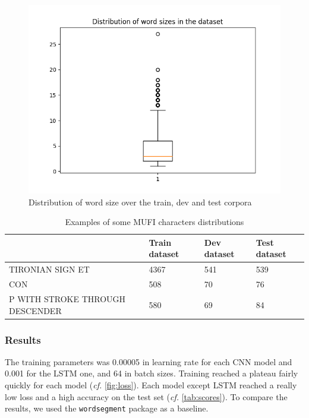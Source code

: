 \documentclass{jdmdh}
\begin{document}
\begin{figure}[!ht]
  \centering
  \includegraphics[width=\linewidth]{length.png}
  \caption{Distribution of word size over the train, dev and test corpora}
  \label{fig:word_sizes}
\end{figure}

\begin{table}[!ht]
\begin{tabular}{llll}
\hline
                                                   & Train dataset & Dev dataset & Test dataset \\ \hline
TIRONIAN SIGN ET                                   & 4367          & 541         & 539          \\
CON                             & 508           & 70          & 76           \\
P WITH STROKE THROUGH DESCENDER & 580           & 69          & 84           \\ \hline
\end{tabular}
  \caption{Examples of some MUFI characters distributions}
  \label{tab:mufi_examples}
\end{table}

\subsubsection{Results}

The training parameters was 0.00005 in learning rate for each CNN model and 0.001 for the LSTM one, and 64 in batch sizes. Training reached a plateau fairly quickly for each model (\textit{cf.} \ref{fig:loss}). Each model except LSTM reached a really low loss and a high accuracy on the test set (\textit{cf.} \ref{tab:scores}). To compare the results, we used the \texttt{wordsegment} package \citet{WordSegment} as a baseline.
\end{document}
